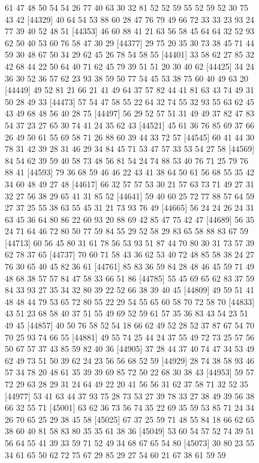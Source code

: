\documentclass{article}
\begin{document}
\begin{figure}[H]
\begin{Schunk}
\begin{Soutput}
[44305] 61 47 48 50 54 54 26 77 40 63 30 32 81 52 52 59 55 52 59 52 30 75 43 42
[44329] 40 64 54 53 88 60 28 47 76 79 49 66 72 33 33 23 93 24 77 39 40 52 48 51
[44353] 46 60 88 41 21 63 56 58 45 64 64 32 52 93 62 50 40 53 60 76 58 47 30 29
[44377] 29 75 20 35 30 73 38 45 71 44 59 30 48 67 50 34 29 62 45 26 78 54 58 55
[44401] 33 58 62 27 85 32 42 68 44 22 50 64 40 71 62 45 79 39 51 51 20 30 40 62
[44425] 34 24 36 30 52 36 57 62 23 93 38 59 50 77 54 45 53 38 75 60 40 49 63 20
[44449] 49 52 81 21 66 21 41 49 64 37 57 82 44 41 81 63 43 74 49 31 50 28 49 33
[44473] 57 54 47 58 55 22 64 32 74 55 32 93 55 63 62 45 43 49 68 48 56 40 28 75
[44497] 56 29 52 57 51 31 49 49 37 82 47 83 54 37 23 27 65 30 74 41 24 35 62 43
[44521] 45 61 36 76 85 69 37 66 26 49 50 61 55 69 58 71 26 88 60 39 44 33 72 57
[44545] 60 41 44 30 78 31 42 39 28 31 46 29 34 84 45 71 53 47 57 33 53 54 27 58
[44569] 84 54 62 39 59 40 58 73 48 56 81 54 24 74 88 53 40 76 71 25 79 76 88 41
[44593] 79 36 68 59 46 46 22 43 41 38 64 50 61 56 68 55 35 42 34 60 48 49 27 48
[44617] 66 32 57 57 53 30 21 57 63 73 71 49 27 31 32 27 56 38 29 65 41 31 85 52
[44641] 59 40 60 25 72 77 88 57 64 59 27 37 25 55 38 63 55 45 31 21 73 93 76 49
[44665] 56 24 24 26 24 31 63 45 36 64 80 86 22 60 93 20 88 69 42 85 47 75 42 47
[44689] 56 35 24 71 64 46 72 80 50 77 59 84 55 29 52 58 29 83 65 58 88 83 67 59
[44713] 60 56 45 80 31 61 78 56 53 93 51 87 44 70 80 30 31 73 57 39 62 78 37 65
[44737] 70 60 71 58 43 36 62 53 40 72 48 85 58 38 24 27 76 30 65 40 45 82 36 61
[44761] 85 83 36 59 84 28 48 46 45 59 71 49 48 68 38 57 57 84 47 58 33 66 51 86
[44785] 55 45 69 65 62 83 37 59 84 33 93 27 35 34 32 80 39 22 52 66 38 39 40 45
[44809] 49 59 51 41 48 48 44 79 53 65 72 80 55 22 29 54 55 65 60 58 70 72 58 70
[44833] 43 51 23 68 58 40 37 51 55 49 69 52 59 61 57 35 36 83 43 54 23 51 49 45
[44857] 40 50 76 58 52 54 18 66 62 49 52 28 52 37 87 67 54 70 70 25 93 74 66 55
[44881] 49 55 74 25 44 24 37 55 49 72 73 25 57 56 50 67 57 37 43 85 59 82 40 36
[44905] 37 28 44 37 40 74 47 34 53 49 62 49 73 51 50 39 62 24 23 56 56 68 52 59
[44929] 28 74 38 58 93 46 57 34 78 20 48 61 35 39 39 69 85 72 50 22 68 30 38 43
[44953] 59 57 72 29 63 28 29 31 24 64 49 22 20 41 56 56 31 62 37 58 71 32 52 35
[44977] 53 41 63 44 37 93 75 28 73 53 27 39 78 33 27 38 49 39 56 38 66 32 55 71
[45001] 63 62 36 73 56 74 35 22 69 35 59 53 85 71 24 34 26 70 65 25 29 38 45 58
[45025] 67 37 25 59 71 48 55 84 18 66 62 65 38 60 40 81 58 83 80 35 35 61 38 36
[45049] 53 60 54 57 52 74 39 51 56 64 55 41 39 33 59 71 52 49 34 68 67 65 54 80
[45073] 30 80 23 55 34 61 65 50 62 72 75 67 29 85 29 27 54 60 21 67 38 61 59 59

\end{Soutput}
\end{Schunk}
\end{figure}
\end{document}
